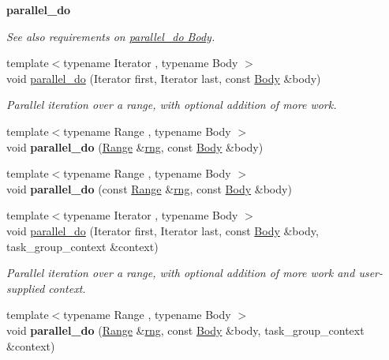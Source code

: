 \begin{Indent}{\bf parallel\+\_\+do}\par
{\em See also requirements on \hyperlink{parallel_do_body_req}{parallel\+\_\+do Body}. }\begin{DoxyCompactItemize}
\item 
{\footnotesize template$<$typename Iterator , typename Body $>$ }\\void \hyperlink{group__algorithms_ga533f6732498ade8634a9470cbf89192d}{parallel\+\_\+do} (Iterator first, Iterator last, const \hyperlink{classBody}{Body} \&body)
\begin{DoxyCompactList}\small\item\em Parallel iteration over a range, with optional addition of more work. \end{DoxyCompactList}\item 
\hypertarget{group__algorithms_ga135f72b966cd78a14f6aa1ddf0480701}{}{\footnotesize template$<$typename Range , typename Body $>$ }\\void {\bfseries parallel\+\_\+do} (\hyperlink{classtbb_1_1blocked__range}{Range} \&\hyperlink{structrng}{rng}, const \hyperlink{classBody}{Body} \&body)\label{group__algorithms_ga135f72b966cd78a14f6aa1ddf0480701}

\item 
\hypertarget{group__algorithms_gaaaf7a7c53d20fef24acaa2fe5cc36b45}{}{\footnotesize template$<$typename Range , typename Body $>$ }\\void {\bfseries parallel\+\_\+do} (const \hyperlink{classtbb_1_1blocked__range}{Range} \&\hyperlink{structrng}{rng}, const \hyperlink{classBody}{Body} \&body)\label{group__algorithms_gaaaf7a7c53d20fef24acaa2fe5cc36b45}

\item 
{\footnotesize template$<$typename Iterator , typename Body $>$ }\\void \hyperlink{group__algorithms_ga7db29bc10d81eddc85854256ffc723c0}{parallel\+\_\+do} (Iterator first, Iterator last, const \hyperlink{classBody}{Body} \&body, task\+\_\+group\+\_\+context \&context)
\begin{DoxyCompactList}\small\item\em Parallel iteration over a range, with optional addition of more work and user-\/supplied context. \end{DoxyCompactList}\item 
\hypertarget{group__algorithms_ga137e8ff95a0c69e747f4f4f1383a2677}{}{\footnotesize template$<$typename Range , typename Body $>$ }\\void {\bfseries parallel\+\_\+do} (\hyperlink{classtbb_1_1blocked__range}{Range} \&\hyperlink{structrng}{rng}, const \hyperlink{classBody}{Body} \&body, task\+\_\+group\+\_\+context \&context)\label{group__algorithms_ga137e8ff95a0c69e747f4f4f1383a2677}


\end{DoxyCompactItemize}
\end{Indent}

